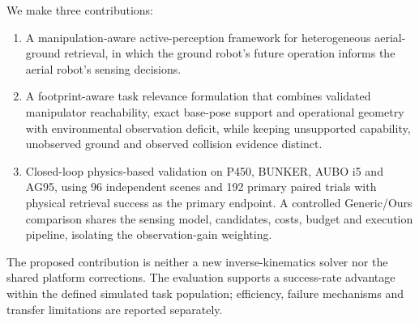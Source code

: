 We make three contributions:
\begin{enumerate}
\item A manipulation-aware active-perception framework for heterogeneous
aerial-ground retrieval, in which the ground robot's future operation informs
the aerial robot's sensing decisions.
\item A footprint-aware task relevance formulation that combines validated
manipulator reachability, exact base-pose support and operational geometry with
environmental observation deficit, while keeping unsupported capability,
unobserved ground and observed collision evidence distinct.
\item Closed-loop physics-based validation on P450, BUNKER, AUBO i5 and AG95,
using 96 independent scenes and 192 primary paired trials with physical retrieval
success as the primary endpoint. A controlled Generic/Ours comparison shares
the sensing model, candidates, costs, budget and execution pipeline, isolating
the observation-gain weighting.
\end{enumerate}
The proposed contribution is neither a new inverse-kinematics solver nor the
shared platform corrections. The evaluation supports a success-rate advantage
within the defined simulated task population; efficiency, failure mechanisms
and transfer limitations are reported separately.
